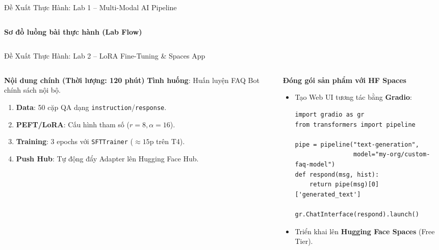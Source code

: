 \documentclass[aspectratio=169, 10pt]{beamer}
\begin{document}
\begin{frame}{Đề Xuất Thực Hành: Lab 1 -- Multi-Modal AI Pipeline}
\begin{columns}[T]
\begin{column}{0.50\textwidth}
\begin{block}{\textbf{Sơ đồ luồng bài thực hành (Lab Flow)}}
\begin{center}
      \end{center}
    \end{block}
  \end{column}
\end{columns}
\end{frame}

\begin{frame}[fragile]{Đề Xuất Thực Hành: Lab 2 -- LoRA Fine-Tuning \& Spaces App}
\begin{columns}[T]
  \begin{column}{0.48\textwidth}
    \begin{block}{\textbf{Nội dung chính (Thời lượng: 120 phút)}}
      \small
      \textbf{Tình huống}: Huấn luyện FAQ Bot chính sách nội bộ.
      \begin{enumerate}\setlength{\itemsep}{1.5pt}
        \item \textbf{Data}: 50 cặp QA dạng \texttt{instruction}/\texttt{response}.
        \item \textbf{PEFT/LoRA}: Cấu hình tham số ($r=8, \alpha=16$).
        \item \textbf{Training}: 3 epochs với \texttt{SFTTrainer} ($\approx 15$p trên T4).
        \item \textbf{Push Hub}: Tự động đẩy Adapter lên Hugging Face Hub.
      \end{enumerate}
    \end{block}
  \end{column}

  \begin{column}{0.48\textwidth}
    \begin{exampleblock}{\textbf{Đóng gói sản phẩm với HF Spaces}}
      \small
      \begin{itemize}\setlength{\itemsep}{1pt}
        \item Tạo Web UI tương tác bằng \textbf{Gradio}:
\begin{lstlisting}[basicstyle=\ttfamily\fontsize{6.5pt}{7.8pt}\selectfont]
import gradio as gr
from transformers import pipeline

pipe = pipeline("text-generation", 
                model="my-org/custom-faq-model")
def respond(msg, hist):
    return pipe(msg)[0]['generated_text']

gr.ChatInterface(respond).launch()
\end{lstlisting}
        \item Triển khai lên \textbf{Hugging Face Spaces} (Free Tier).
      \end{itemize}
    \end{exampleblock}
  \end{column}
\end{columns}
\end{frame}
\end{document}
